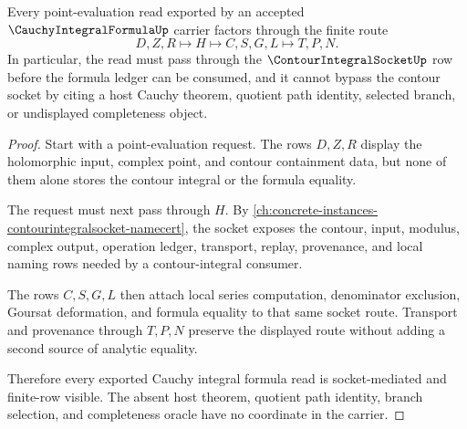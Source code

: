 \begin{theorem}
\label{thm:cauchy-integral-formula-contour-socket-route}
Every point-evaluation read exported by an accepted $\CauchyIntegralFormulaUp$ carrier factors through the finite route
$$
D,Z,R \longmapsto H \longmapsto C,S,G,L \longmapsto T,P,N .
$$
In particular, the read must pass through the $\ContourIntegralSocketUp$ row before the formula ledger can be consumed, and it cannot bypass the contour socket by citing a host Cauchy theorem, quotient path identity, selected branch, or undisplayed completeness object.
\end{theorem}
\begin{proof}
Start with a point-evaluation request. The rows $D,Z,R$ display the holomorphic input, complex point, and contour containment data, but none of them alone stores the contour integral or the formula equality.

The request must next pass through $H$. By \autoref{ch:concrete-instances-contourintegralsocket-namecert}, the socket exposes the contour, input, modulus, complex output, operation ledger, transport, replay, provenance, and local naming rows needed by a contour-integral consumer.

The rows $C,S,G,L$ then attach local series computation, denominator exclusion, Goursat deformation, and formula equality to that same socket route. Transport and provenance through $T,P,N$ preserve the displayed route without adding a second source of analytic equality.

Therefore every exported Cauchy integral formula read is socket-mediated and finite-row visible. The absent host theorem, quotient path identity, branch selection, and completeness oracle have no coordinate in the carrier.
\end{proof}



